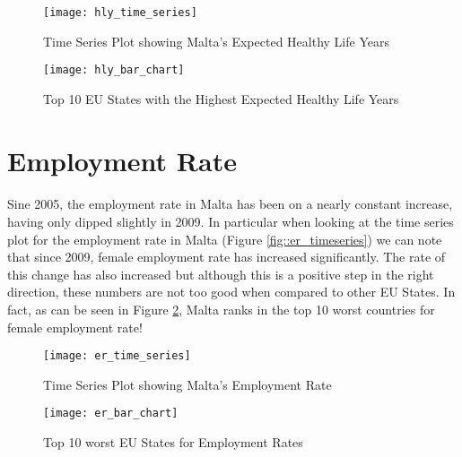 \begin{figure}[!t]
	\begin{minipage}[b]{0.45\linewidth}
		\centering
		\texttt{[image: hly\_time\_series]}
		\caption[Healthy Life Years in Malta]{Time Series Plot showing Malta's Expected Healthy Life Years}
		\label{fig::hly_timeseries}
	\end{minipage}	
	\hspace{0.5cm}
	\begin{minipage}[b]{0.45\linewidth}
		\centering
		\texttt{[image: hly\_bar\_chart]}
		\caption[Top Healthy Life Years in the EU]{Top 10 EU States with the Highest Expected Healthy Life Years}
		\label{fig::hly_bar}
	\end{minipage}	
\end{figure}  

\section{Employment Rate}
\paragraph{ }Sine 2005, the employment rate in Malta has been on a nearly constant increase, having only dipped slightly in 2009. In particular when looking at the time series plot for the employment rate in Malta (Figure \ref{fig::er_timeseries}) we can note that since 2009, female employment rate has increased significantly. The rate of this change has also increased but although this is a positive step in the right direction, these numbers are not too good when compared to other EU States. In fact, as can be seen in Figure \ref{fig::er_bar}, Malta ranks in the top 10 worst countries for female employment rate!

 \begin{figure}[!b]
 	\begin{minipage}[b]{0.45\linewidth}
 		\centering
 		\texttt{[image: er\_time\_series]}
 		\caption[Employment Rate in Malta]{Time Series Plot showing Malta's Employment Rate}
 		\label{fig::er_timeseries}
 	\end{minipage}	
 	\hspace{0.5cm}
 	\begin{minipage}[b]{0.45\linewidth}
 		\centering
 		\texttt{[image: er\_bar\_chart]}
 		\caption[Worst Employment Rate Values in the EU]{Top 10 worst EU States for Employment Rates}
 		\label{fig::er_bar}
 	\end{minipage}	
 \end{figure}  